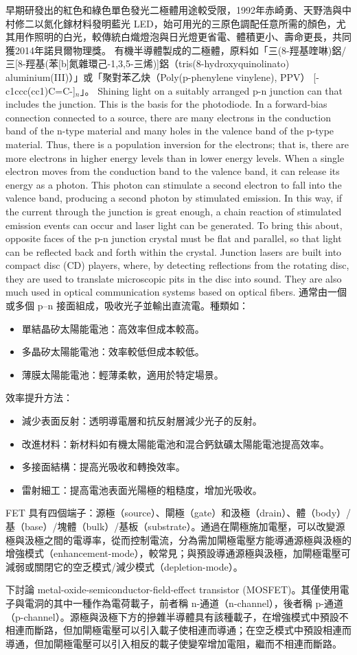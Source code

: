 \documentclass[a4paper,12pt]{article}
\begin{document}
早期研發出的紅色和綠色單色發光二極體用途較受限，1992年赤崎勇、天野浩與中村修二以氮化鎵材料發明藍光 LED，始可用光的三原色調配任意所需的顏色，尤其用作照明的白光，較傳統白熾燈泡與日光燈更省電、體積更小、壽命更長，共同獲2014年諾貝爾物理獎。
有機半導體製成的二極體，原料如「三(8-羥基喹啉)鋁/三[8-羥基(苯[b]氮雜環己-1,3,5-三烯)]鋁（tris(8-hydroxyquinolinato) aluminium(III)）」或「聚對苯乙炔（Poly(p-phenylene vinylene), PPV） [-c1ccc(cc1)C=C-]$_n$」。
Shining light on a suitably arranged p-n junction can that includes the junction. This is the basis for the photodiode.
In a forward-bias connection connected to a source, there are many electrons in the conduction band of the n-type material and many holes in the valence band of the p-type  material. Thus, there is a population inversion for the electrons; that is, there are more electrons in higher energy levels than in lower energy levels. When a single electron moves from the conduction band to the valence band, it can release its energy as a photon. This photon can stimulate a second electron to fall into the valence band, producing a second photon by stimulated emission. In this way, if the current through the junction is great enough, a chain reaction of stimulated emission events can occur and laser light can be generated. To bring this about, opposite faces of the p-n junction crystal must be flat and parallel, so that light can be reflected back and forth within the crystal. Junction lasers are built into compact disc (CD) players, where, by detecting reflections from the rotating disc, they are used to translate microscopic pits in the disc into sound. They are also much used in optical communication systems based on optical fibers.
通常由一個或多個 p–n 接面組成，吸收光子並輸出直流電。種類如：
\begin{itemize}
\item 單結晶矽太陽能電池：高效率但成本較高。
\item 多晶矽太陽能電池：效率較低但成本較低。
\item 薄膜太陽能電池：輕薄柔軟，適用於特定場景。
\end{itemize}
效率提升方法：
\begin{itemize}
\item 減少表面反射：透明導電層和抗反射層減少光子的反射。
\item 改進材料：新材料如有機太陽能電池和混合鈣鈦礦太陽能電池提高效率。
\item 多接面結構：提高光吸收和轉換效率。
\item 雷射細工：提高電池表面光陽極的粗糙度，增加光吸收。
\end{itemize}
FET 具有四個端子：源極（source）、閘極（gate）和汲極（drain）、體（body）/基（base）/塊體（bulk）/基板（substrate）。通過在閘極施加電壓，可以改變源極與汲極之間的電導率，從而控制電流，分為需加閘極電壓方能導通源極與汲極的增強模式（enhancement-mode），較常見；與預設導通源極與汲極，加閘極電壓可減弱或關閉它的空乏模式/減少模式（depletion-mode）。

下討論 metal-oxide-semiconductor-field-effect transistor (MOSFET)。其僅使用電子與電洞的其中一種作為電荷載子，前者稱 n-通道（n-channel），後者稱 p-通道（p-channel）。源極與汲極下方的摻雜半導體具有該種載子，在增強模式中預設不相連而斷路，但加閘極電壓可以引入載子使相連而導通；在空乏模式中預設相連而導通，但加閘極電壓可以引入相反的載子使變窄增加電阻，繼而不相連而斷路。
\end{document}
